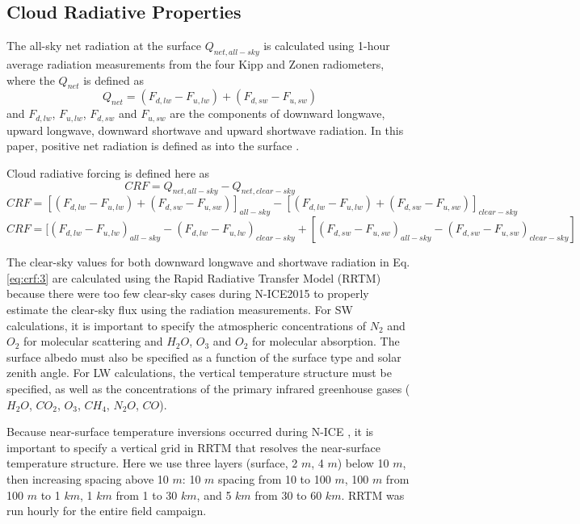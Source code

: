\subsection{Cloud Radiative Properties}

The all-sky net radiation at the surface $Q_{net, all-sky}$ is calculated using 1-hour average radiation measurements from the four Kipp and Zonen radiometers, where the $Q_{net}$ is defined as
\begin{equation}\label{eq:qnet}
Q_{net} = (F_{d,lw} - F_{u,lw}) + (F_{d,sw} - F_{u,sw})
\end{equation}
and $F_{d,lw}$, $F_{u,lw}$, $F_{d,sw}$ and $F_{u,sw}$ are the components of downward longwave, upward longwave, downward shortwave and upward shortwave radiation. In this paper, positive net radiation is defined as into the surface \citep{miller:2015}.

Cloud radiative forcing is defined here \citep{ramanathan:1989, miller:2015} as 
\begin{equation}\label{eq:crf:1}
CRF = Q_{net, all-sky} - Q_{net, clear-sky}
\end{equation}
\begin{equation}\label{eq:crf:2}
CRF = [(F_{d,lw} - F_{u,lw}) + (F_{d,sw} - F_{u,sw})]_{all-sky} - [(F_{d,lw} - F_{u,lw}) + (F_{d,sw} - F_{u,sw})]_{clear-sky}
\end{equation}
\begin{equation}\label{eq:crf:3}
CRF = [(F_{d,lw} - F_{u,lw})_{all-sky} - (F_{d,lw} - F_{u,lw})_{clear-sky}
+ [(F_{d,sw} - F_{u,sw})_{all-sky} -  (F_{d,sw} - F_{u,sw})_{clear-sky}]
\end{equation}

The clear-sky values for both downward longwave and shortwave radiation in Eq. \ref{eq:crf:3} are calculated using the Rapid Radiative Transfer Model (RRTM) \citep{mlawer:1997} because there were too few clear-sky cases during N-ICE2015 to properly estimate the clear-sky flux using the radiation measurements. For SW calculations, it is important to specify the atmospheric concentrations of $N_{2}$ and $O_{2}$ for molecular scattering and $H_{2}O$, $O_{3}$ and $O_{2}$ for molecular absorption. The surface albedo must also be specified as a function of the surface type and solar zenith angle. For LW calculations, the vertical temperature structure must be specified, as well as the concentrations of the primary infrared greenhouse gases ($H_{2}O$, $CO_{2}$, $O_{3}$, $CH_{4}$, $N_{2}O$, $CO$).

Because near-surface temperature inversions occurred during N-ICE \citep{kayser:2017}, it is important to specify a vertical grid in RRTM that resolves the near-surface temperature structure. Here we use three layers (surface, 2 $m$, 4 $m$) below 10 $m$, then increasing spacing above 10 $m$: 10 $m$ spacing from 10 to 100 $m$, 100 $m$ from 100 $m$ to 1 $km$, 1 $km$ from 1 to 30 $km$, and 5 $km$ from 30 to 60 $km$. RRTM was run hourly for the entire field campaign.

